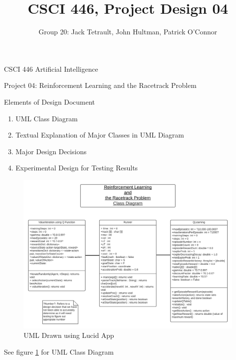 \documentclass{article}
\title{CSCI 446, Project Design 04}
\author{Group 20: Jack Tetrault, John Hultman, Patrick O'Connor}
\begin{document}
\maketitle

CSCI 446 Artificial Intelligence

Project 04: Reinforcement Learning and the Racetrack Problem

Elements of Design Document
\begin{enumerate}
    \item UML Class Diagram
    \item Textual Explanation of Major Classes in UML Diagram
    \item Major Design Decisions
    \item Experimental Design for Testing Results
\end{enumerate}




\begin{figure}
    \includegraphics[width=\textwidth]{ReinforcementUMLDiagram.png}
    \caption{UML Drawn using Lucid App}
    \label{fig:num01}
\end{figure}
See figure \ref{fig:num01} for UML Class Diagram

\end{document}
